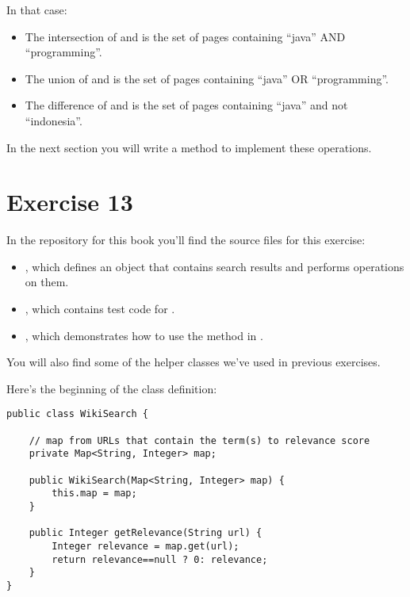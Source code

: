 \documentclass[12pt]{book}
\theoremstyle{exercise}
\begin{document}
In that case:

\begin{itemize}

\item
  The intersection of  and  is the set of pages
  containing ``java'' AND ``programming''.

\item
  The union of  and  is the set of pages
  containing ``java'' OR ``programming''.

\item
  The difference of  and  is the set of pages
  containing ``java'' and not ``indonesia''.
\end{itemize}

In the next section you will write a method to implement these operations.



\section{Exercise 13}
\label{exercise13}

In the repository for this book
you'll find the source files for this exercise:

\begin{itemize}

\item
  , which defines an object that contains search
  results and performs operations on them.

\item
  , which contains test code for
  .

\item
  , which demonstrates how to use the 
  method in .

\end{itemize}

You will also find some of the helper classes we've used in previous
exercises.


Here's the beginning of the  class definition:

\begin{verbatim}
public class WikiSearch {

    // map from URLs that contain the term(s) to relevance score
    private Map<String, Integer> map;

    public WikiSearch(Map<String, Integer> map) {
        this.map = map;
    }

    public Integer getRelevance(String url) {
        Integer relevance = map.get(url);
        return relevance==null ? 0: relevance;
    }
}
\end{verbatim}
\end{document}
